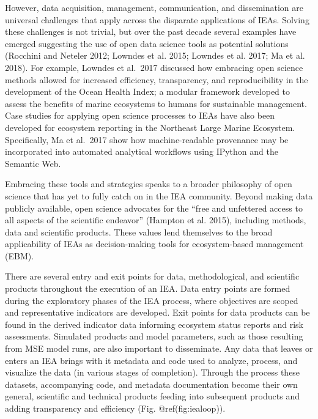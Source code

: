 \documentclass[
]{article}
\begin{document}
However, data acquisition, management, communication, and dissemination
are universal challenges that apply across the disparate applications of
IEAs. Solving these challenges is not trivial, but over the past decade
several examples have emerged suggesting the use of open data science
tools as potential solutions (Rocchini and Neteler 2012; Lowndes et al.
2015; Lowndes et al. 2017; Ma et al. 2018). For example, Lowndes et
al.~2017 discussed how embracing open science methods allowed for
increased efficiency, transparency, and reproducibility in the
development of the Ocean Health Index; a modular framework developed to
assess the benefits of marine ecosystems to humans for sustainable
management. Case studies for applying open science processes to IEAs
have also been developed for ecosystem reporting in the Northeast Large
Marine Ecosystem. Specifically, Ma et al.~2017 show how machine-readable
provenance may be incorporated into automated analytical workflows using
IPython and the Semantic Web.

Embracing these tools and strategies speaks to a broader philosophy of
open science that has yet to fully catch on in the IEA community. Beyond
making data publicly available, open science advocates for the ``free
and unfettered access to all aspects of the scientific endeavor''
(Hampton et al. 2015), including methods, data and scientific products.
These values lend themselves to the broad applicability of IEAs as
decision-making tools for ecosystem-based management (EBM).

There are several entry and exit points for data, methodological, and
scientific products throughout the execution of an IEA. Data entry
points are formed during the exploratory phases of the IEA process,
where objectives are scoped and representative indicators are developed.
Exit points for data products can be found in the derived indicator data
informing ecosystem status reports and risk assessments. Simulated
products and model parameters, such as those resulting from MSE model
runs, are also important to disseminate. Any data that leaves or enters
an IEA brings with it metadata and code used to analyze, process, and
visualize the data (in various stages of completion). Through the
process these datasets, accompanying code, and metadata documentation
become their own general, scientific and technical products feeding into
subsequent products and adding transparency and efficiency (Fig.
@ref(fig:iealoop)).
\end{document}
